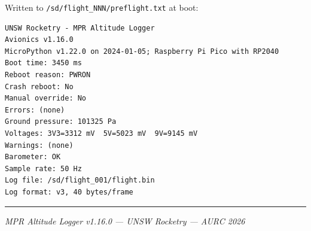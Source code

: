 \documentclass[11pt, a4paper, twoside]{article}
\newcommand{\file}[1]{\texttt{#1}}
\begin{document}
Written to \file{/sd/flight\_NNN/preflight.txt} at boot:

\begin{lstlisting}[basicstyle=\ttfamily\scriptsize]
UNSW Rocketry - MPR Altitude Logger
Avionics v1.16.0
MicroPython v1.22.0 on 2024-01-05; Raspberry Pi Pico with RP2040
Boot time: 3450 ms
Reboot reason: PWRON
Crash reboot: No
Manual override: No
Errors: (none)
Ground pressure: 101325 Pa
Voltages: 3V3=3312 mV  5V=5023 mV  9V=9145 mV
Warnings: (none)
Barometer: OK
Sample rate: 50 Hz
Log file: /sd/flight_001/flight.bin
Log format: v3, 40 bytes/frame
\end{lstlisting}

\vspace{2em}
\hrule
\vspace{0.5em}
\begin{center}
\small\textit{MPR Altitude Logger v1.16.0 --- UNSW Rocketry --- AURC 2026}
\end{center}
\end{document}
